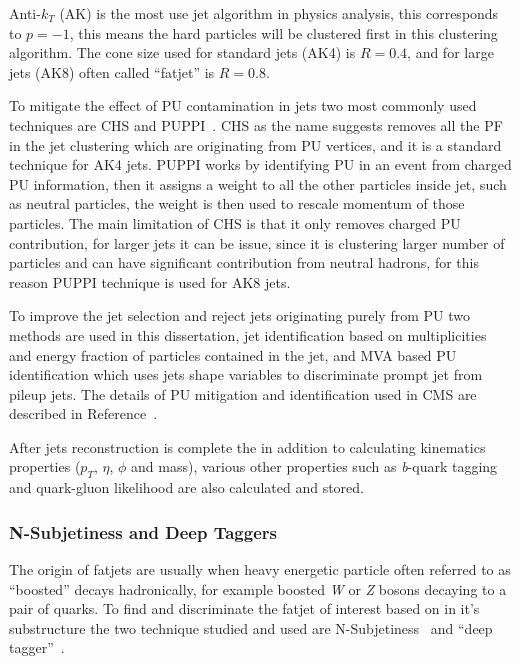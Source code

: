 Anti-\( k_T \) (AK) is the most use jet algorithm in physics analysis, this corresponds to
\( p = -1\), this means the hard particles will be clustered first in this clustering
algorithm.
The cone size used for standard jets (AK4) is \( R = 0.4 \), and for large jets (AK8) often called
``fatjet'' is \( R = 0.8 \).

To mitigate the effect of \gls{PU} contamination in jets two most commonly used
techniques are \gls{CHS} and \gls{PUPPI}~\cite{puppi2014}.
\gls{CHS} as the name suggests removes all the \gls{PF} in the jet clustering which are
originating from \gls{PU} vertices, and it is a standard technique for AK4 jets.
\gls{PUPPI} works by identifying \gls{PU} in an event from charged \gls{PU} information,
then it assigns a weight to all the other particles inside jet, such as neutral particles,
the weight is then used to rescale momentum of those particles.
The main limitation of \gls{CHS} is that it only removes charged \gls{PU} contribution,
for larger jets it can be issue, since it is clustering larger number of particles
and can have significant contribution from neutral hadrons, for this reason \gls{PUPPI}
technique is used for AK8 jets.

To improve the jet selection and reject jets originating purely from \gls{PU}
two methods are used in this dissertation, jet identification based on
multiplicities and energy fraction of particles contained in the jet,
and \gls{MVA} based \gls{PU} identification which uses jets shape
variables to discriminate prompt jet from pileup jets.
The details of \gls{PU} mitigation and identification used in
\gls{CMS} are described in Reference~\cite{cms-jme-pu-run2}.

After jets reconstruction is complete the in addition to calculating kinematics
properties (\( p_T \), \( \eta \), \( \phi \) and mass), various other
properties such as \textit{b}-quark tagging and quark-gluon likelihood are also
calculated and stored.

\subsubsection{
  N-Subjetiness and Deep Taggers
}

The origin of fatjets are usually when heavy energetic particle
often referred to as ``boosted'' decays hadronically,
for example boosted \textit{W} or \textit{Z} bosons decaying to a pair of quarks.
To find and discriminate the fatjet of interest based on in it's substructure
the two technique studied and used are N-Subjetiness~\cite{tau21-paper}
and ``deep tagger''~\cite{cms-jme-deep-tagger}.

